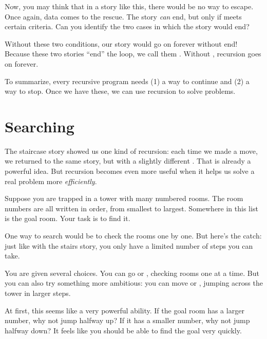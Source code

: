 Now, you may think that in a story like this, there would be no way to escape. Once again, data
comes to the rescue. The story \emph{can} end, but only if  meets certain criteria. Can
you identify the two cases in which the story would end?

Without these two conditions, our story would go on forever without end! Because these two stories
``end'' the loop, we call them . Without , recursion goes on
forever.

To summarize, every recursive program needs (1) a way to continue and (2) a way to stop. Once we
have these, we can use recursion to solve problems.

\section{Searching}

The staircase story showed us one kind of recursion: each time we made a move, we returned to the
same story, but with a slightly different . That is already a powerful idea. But
recursion becomes even more useful when it helps us solve a real problem more \emph{efficiently}.

Suppose you are trapped in a tower with many numbered rooms. The room numbers are all written in
order, from smallest to largest. Somewhere in this list is the goal room. Your task is to find it.

One way to search would be to check the rooms one by one. But here's the catch: just like with the
stairs story, you only have a limited number of steps you can take.

You are given several choices. You can go  or , checking rooms one at
a time. But you can also try something more ambitious: you can move  or
, jumping across the tower in larger steps.

At first, this seems like a very powerful ability. If the goal room has a larger number, why not
jump halfway up? If it has a smaller number, why not jump halfway down? It feels like you should be
able to find the goal very quickly.

